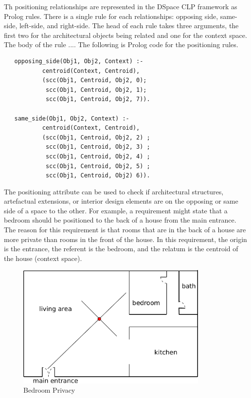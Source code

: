 \documentclass[12pt]{ucthesis}
\begin{document}
Th positioning relationships are represented in the DSpace CLP framework as Prolog rules. There is a single rule for each relationships: opposing side, same-side, left-side, and right-side. The head of each rule takes three arguments, the first two for the architectural objects being related and one for the context space. The body of the rule ....  The following is Prolog code for the positioning rules.
\begin{verbatim}
   opposing_side(Obj1, Obj2, Context) :- 
           centroid(Context, Centroid),
           (scc(Obj1, Centroid, Obj2, 0);
            scc(Obj1, Centroid, Obj2, 1);
            scc(Obj1, Centroid, Obj2, 7)).
                                          
   same_side(Obj1, Obj2, Context) :- 
           centroid(Context, Centroid),
           (scc(Obj1, Centroid, Obj2, 2) ;
            scc(Obj1, Centroid, Obj2, 3) ;
            scc(Obj1, Centroid, Obj2, 4) ;
            scc(Obj1, Centroid, Obj2, 5) ;
            scc(Obj1, Centroid, Obj2) 6)).   

\end{verbatim}

The positioning attribute can be used to check if architectural structures, artefactual extensions, or interior design elements are on the opposing or same side of a space to the other. For example, a requirement might state that a bedroom should be positioned to the back of a house from the main entrance. The reason for this requirement is that rooms that are in the back of a house are more private than rooms in the front of the house. In this requirement, the origin is the entrance, the referent is the bedroom, and the relatum is the centroid of the house (context space). 
\begin{figure}[H]
 \centering
 \includegraphics[width=95mm]{bedroom-back-house}
 \caption{Bedroom Privacy}
\label{privacy}
\end{figure}
\end{document}
